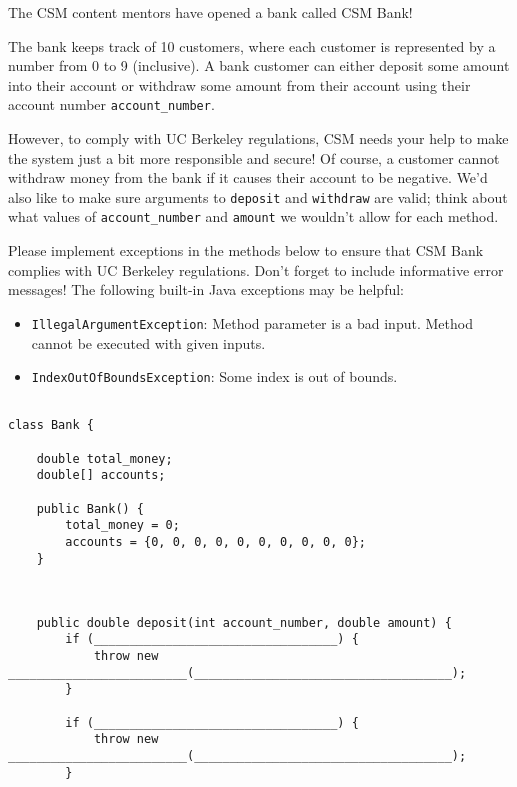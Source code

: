 \question
\begin{parts}

\item The CSM content mentors have opened a bank called CSM Bank!

The bank keeps track of 10 customers, where each customer is represented by a number from 0 to 9 (inclusive). A bank customer can either deposit some amount into their account or withdraw some amount from their account using their account number \lstinline{account_number}.

However, to comply with UC Berkeley regulations, CSM needs your help to make the system just a bit more responsible and secure!
Of course, a customer cannot withdraw money from the bank if it causes their account to be negative.
We'd also like to make sure arguments to \lstinline{deposit} and \lstinline{withdraw} are valid; think about what values of \lstinline{account_number} and \lstinline{amount} we wouldn't allow for each method.

Please implement exceptions in the methods below to ensure that CSM Bank complies with UC Berkeley regulations.
Don't forget to include informative error messages!
The following built-in Java exceptions may be helpful:
\begin{itemize}
    \item \lstinline{IllegalArgumentException}: Method parameter is a bad input. Method cannot be executed with given inputs.
    \item \lstinline{IndexOutOfBoundsException}: Some index is out of bounds.
\end{itemize}

\ifprintanswers\else
\begin{lstlisting}

class Bank {

    double total_money;
    double[] accounts;
    
    public Bank() {
        total_money = 0;
        accounts = {0, 0, 0, 0, 0, 0, 0, 0, 0, 0};
    }
    
\end{lstlisting}

\pagebreak
\begin{lstlisting}
 
    public double deposit(int account_number, double amount) {
        if (__________________________________) {
            throw new _________________________(____________________________________);
        }
        
        if (__________________________________) {
            throw new _________________________(____________________________________);
        }


\end{lstlisting}
\end{parts}
